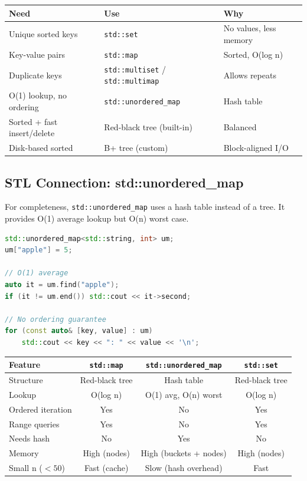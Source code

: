 \begin{center}
\begin{tabular}{lll}
\toprule
Need & Use & Why \\
\midrule
Unique sorted keys & \texttt{std::set} & No values, less memory \\
Key-value pairs & \texttt{std::map} & Sorted, O(log n) \\
Duplicate keys & \texttt{std::multiset} / \texttt{std::multimap} & Allows repeats \\
O(1) lookup, no ordering & \texttt{std::unordered\_map} & Hash table \\
Sorted + fast insert/delete & Red-black tree (built-in) & Balanced \\
Disk-based sorted & B+ tree (custom) & Block-aligned I/O \\
\bottomrule
\end{tabular}
\end{center}

\subsection{STL Connection: std::unordered\_map}

For completeness, \texttt{std::unordered\_map} uses a hash table instead of a tree. It provides O(1) average lookup but O(n) worst case.

\begin{lstlisting}[language=C++]
std::unordered_map<std::string, int> um;
um["apple"] = 5;

// O(1) average
auto it = um.find("apple");
if (it != um.end()) std::cout << it->second;

// No ordering guarantee
for (const auto& [key, value] : um)
    std::cout << key << ": " << value << '\n';
\end{lstlisting}

\begin{center}
\begin{tabular}{lccc}
\toprule
Feature & \texttt{std::map} & \texttt{std::unordered\_map} & \texttt{std::set} \\
\midrule
Structure & Red-black tree & Hash table & Red-black tree \\
Lookup & O(log n) & O(1) avg, O(n) worst & O(log n) \\
Ordered iteration & Yes & No & Yes \\
Range queries & Yes & No & Yes \\
Needs hash & No & Yes & No \\
Memory & High (nodes) & High (buckets + nodes) & High (nodes) \\
Small n ($<50$) & Fast (cache) & Slow (hash overhead) & Fast \\
\bottomrule
\end{tabular}
\end{center}

